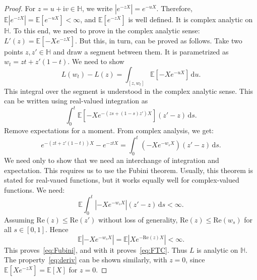 \documentclass[10pt,a4paper]{amsart}
\begin{document}
\begin{proof} For $z = u + \mathrm{i}v \in \mathbb H$, we write $|e^{-zX}| = e^{-uX}$. Therefore, $\mathbb E|e^{-zX}| = \mathbb E[e^{-uX}] < \infty$, and $\mathbb E[e^{-zX}]$ is well defined. It is complex analytic on $\mathbb H$. To this end, we need to prove in the complex analytic sense: $L'(z) = \mathbb E[-Xe^{-zX}]$. But this, in turn, can be proved as follows. Take two points $z, z' \in \mathbb H$ and draw a segment between them. It is parametrized as $w_t = zt + z'(1-t)$. We need to show 
\begin{equation}
\label{eq:FTC}
L(w_t) - L(z) = \int_{[z, w_t]}\mathbb E\left[-Xe^{-uX}\right]\,\mathrm{d}u.
\end{equation}
This integral over the segment is understood in the complex analytic sense. This can be written using real-valued integration as
$$
\int_0^t\mathbb E\left[-Xe^{-(zs + (1-s)z')X}\right](z' - z)\,\mathrm{d}s.
$$
Remove expectations for a moment. From complex analysis, we get:
$$
e^{-(zt + z'(1-t))X} - e^{-ztX} = \int_0^t\left(-Xe^{-w_sX}\right)(z' - z)\,\mathrm{d}s.
$$
We need only to show that we need an interchange of integration and expectation. This requires us to use the Fubini theorem. Usually, this theorem is stated for real-vaued functions, but it works equally well for complex-valued functions. We need:
\begin{equation}
\label{eq:Fubini}
\mathbb E\int_0^t\left|-Xe^{-w_sX}\right|(z'-z)\,\mathrm{d}s < \infty.
\end{equation}
Assuming $\mathrm{Re}(z) \le \mathrm{Re}(z')$ without loss of generality, 
$\mathrm{Re}(z) \le \mathrm{Re}(w_s)$ for all $s \in [0, 1]$. Hence
$$
\mathbb E|-Xe^{-w_sX}| = \mathbb E|Xe^{-\mathrm{Re}(z)X}| < \infty.
$$
This proves~\eqref{eq:Fubini}, and with it proves~\eqref{eq:FTC}. Thus $L$ is analytic on $\mathbb H$. The property~\eqref{eq:deriv} can be shown similarly, with $z = 0$, since $\mathbb E[Xe^{-zX}] = \mathbb E[X]$ for $z = 0$. 
\end{proof}
\end{document}

